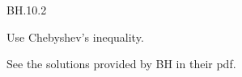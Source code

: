 

\setcounter{theorem}{1}
\begin{exercise} BH.10.2
\begin{hint}
Use Chebyshev's inequality.
\end{hint}
\begin{solution}
See the solutions provided by BH in their pdf.

\end{solution}
\end{exercise}




